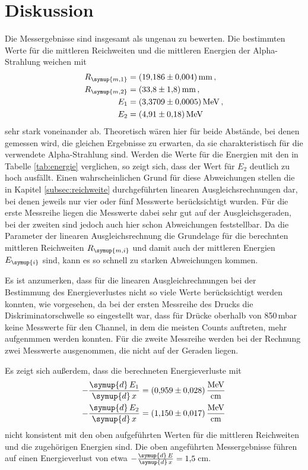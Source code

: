 \section{Diskussion}
\label{sec:Diskussion}

Die Messergebnisse sind insgesamt als ungenau zu bewerten. Die bestimmten Werte
für die mittleren Reichweiten und die mittleren Energien der Alpha-Strahlung
weichen mit
\begin{align*}
  R_{\symup{m,1}}&=\SI{19.186(0004)}{\milli\meter} \,, \\
  R_{\symup{m,2}}&=\SI{33.8(18)}{\milli\meter} \,, \\
  E_1&=\SI{3.3709(00005)}{\MeV} \,,\\
  E_2&=\SI{4.91(018)}{\MeV}
\end{align*}
sehr stark voneinander ab. Theoretisch wären hier für beide Abstände, bei denen gemessen
wird, die gleichen Ergebnisse zu erwarten, da sie charakteristisch für die verwendete
Alpha-Strahlung sind. Werden die Werte für die Energien mit den in Tabelle
\ref{tab:energie} verglichen, so zeigt sich, dass der Wert für $E_2$ deutlich zu
hoch ausfällt. Einen wahrscheinlichen Grund für diese Abweichungen stellen die in
Kapitel \ref{subsec:reichweite} durchgeführten linearen Ausgleichsrechnungen dar,
bei denen jeweils nur vier oder fünf Messwerte berücksichtigt wurden. Für die erste
Messreihe liegen die Messwerte dabei sehr gut auf der Ausgleichsgeraden, bei der
zweiten sind jedoch auch hier schon Abweichungen feststellbar. Da die Parameter
der linearen Ausgleichsrechnung die Grundelage für die berechnten mittleren Reichweiten
$R_{\symup{m,i}}$ und damit auch der mittleren Energien $E_{\symup{i}}$ sind, kann
es so schnell zu starken Abweichungen kommen.

Es ist anzumerken, dass für die linearen Ausgleichrechnungen bei der Bestimmung des
Energieverlustes nicht so viele Werte berücksichtigt werden konnten, wie vorgesehen,
da bei der ersten Messreihe des Drucks die Diskriminatorschwelle so eingestellt war, dass
für Drücke oberhalb von 850\,mbar keine Messwerte für den Channel, in dem die
meisten Counts auftreten, mehr aufgenmmen werden konnten. Für die zweite Messreihe
werden bei der Rechnung zwei Messwerte ausgenommen, die nicht auf der Geraden liegen.

Es zeigt sich außerdem, dass die berechneten Energieverluste mit
\begin{align*}
  -\frac{\symup{d}\,E_1}{\symup{d}\,x}&=\SI{0.959(028)}{\MeV\per\centi\meter} \,\\
  -\frac{\symup{d}\,E_2}{\symup{d}\,x}&=\SI{1.150(017)}{\MeV\per\centi\meter}
\end{align*}
nicht konsistent mit den oben aufgeführten Werten für die mittleren Reichweiten und
die zugehörigen Energien sind. Die oben angeführten Messergebnisse führen auf einen
Energieverlust von etwa $-\frac{\symup{d}\,E}{\symup{d}\,x}=1{,}5\,$cm.

